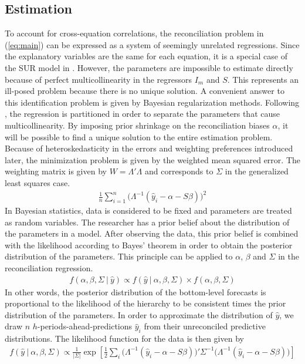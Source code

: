 \documentclass[a4paper,fleqn,11pt]{article}
\begin{document}
\subsection{Estimation}
To account for cross-equation correlations, the reconciliation problem in (\ref{eq:main}) can be expressed as a system of seemingly unrelated regressions. Since the explanatory variables are the same for each equation, it is a special case of the SUR model in \cite{Zellner1962}. However, the parameters are impossible to estimate directly because of perfect multicollinearity in the regressors $I_m$ and $S$. This represents an ill-posed problem because there is no unique solution. A convenient answer to this identification problem is given by Bayesian regularization methods. Following \cite{Farebrother1978}, the regression is partitioned in order to separate the parameters that cause multicollinearity. By imposing prior shrinkage on the reconciliation biases $\alpha$, it will be possible to find a unique solution to the entire estimation problem. Because of heteroskedasticity in the errors and weighting preferences introduced later, the minimization problem is given by the weighted mean squared error. The weighting matrix is given by $W = \Lambda'\Lambda$ and corresponds to $\Sigma$ in the generalized least squares case.
\begin{align}
	\frac{1}{n}\sum_{i=1}^n \Big( \Lambda^{-1}(\hat{y}_i - \alpha - S\beta)\Big)^2
\end{align}
In Bayesian statistics, data is considered to be fixed and parameters are treated as random variables. The researcher has a prior belief about the distribution of the parameters in a model. After observing the data, this prior belief is combined with the likelihood according to Bayes' theorem in order to obtain the posterior distribution of the parameters. This principle can be applied to $\alpha$, $\beta$ and $\Sigma$ in the reconciliation regression.
\begin{align}
	f(\alpha, \beta, \Sigma\ |\ \hat{y}) \propto f(\hat{y}\ |\ \alpha, \beta, \Sigma) \times f(\alpha, \beta, \Sigma)
\end{align}
In other words, the posterior distribution of the bottom-level forecasts is proportional to the likelihood of the hierarchy to be consistent times the prior distribution of the parameters. In order to approximate the distribution of $\hat{y}$, we draw $n$ $h$-periods-ahead-predictions $\hat{y}_i$ from their unreconciled predictive distributions. The likelihood function for the data is then given by 
\begin{align*}
f(\hat{y}\ |\ \alpha,\beta,\Sigma) \propto \frac{1}{|\Sigma|}\exp\left[\frac{1}{2} \sum_i \big( \Lambda^{-1}(\hat{y}_i - \alpha - S\beta)\big)'\Sigma^{-1}\big(\Lambda^{-1}(\hat{y}_i - \alpha - S\beta)\big)\right]
\end{align*}
\end{document}
